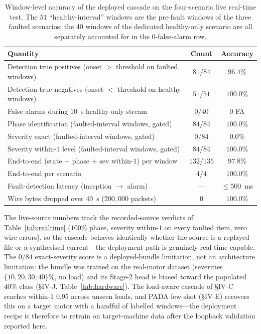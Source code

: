 \documentclass[journal]{IEEEtran}
\begin{document}
\begin{table}[!t]
\caption{Window-level accuracy of the deployed cascade on the four-scenario live
real-time test. The $51$ ``healthy-interval'' windows are the pre-fault windows of
the three faulted scenarios; the $40$ windows of the dedicated healthy-only scenario
are all separately accounted for in the $0$-false-alarm row.}
\label{tab:liveaccuracy}
\centering
\footnotesize
\begin{tabular}{@{}lcc@{}}
\toprule
Quantity & Count & Accuracy \\
\midrule
Detection true positives (onset $>$ threshold on faulted windows) & $81 / 84$ & $96.4\%$ \\
Detection true negatives (onset $<$ threshold on healthy windows) & $51 / 51$ & $100.0\%$ \\
False alarms during $10$~s healthy-only stream & $0 / 40$ & $0$ FA \\
Phase identification (faulted-interval windows, gated) & $84 / 84$ & $\mathbf{100.0\%}$ \\
Severity exact (faulted-interval windows, gated) & $0 / 84$ & $0.0\%$ \\
Severity within-$1$ level (faulted-interval windows, gated) & $84 / 84$ & $\mathbf{100.0\%}$ \\
\midrule
End-to-end (state $+$ phase $+$ sev within-$1$) per window & $132 / 135$ & $\mathbf{97.8\%}$ \\
End-to-end per scenario & $4 / 4$ & $\mathbf{100.0\%}$ \\
Fault-detection latency (inception $\rightarrow$ alarm) & --- & $\leq\!\!500$~ms \\
Wire bytes dropped over $40$~s ($200{,}000$ packets) & $0$ & $100.0\%$ \\
\bottomrule
\end{tabular}
\end{table}

The live-source numbers track the recorded-source verdicts of Table~\ref{tab:realtime}
($100\%$ phase, severity within-$1$ on every faulted item, zero wire errors), so the
cascade behaves identically whether the source is a replayed file or a synthesised
current---the deployment path is genuinely real-time-capable. The $0/84$ exact-severity
score is a deployed-bundle limitation, not an architecture limitation: the bundle was
trained on the real-motor dataset (severities $\{10, 20, 30, 40\}\%$, no load) and its
Stage-$2$ head is biased toward the populated $40\%$ class (\S IV-J,
Table~\ref{tab:hardware}). The load-aware cascade of \S IV-C reaches within-$1$
$0.95$ across unseen loads, and PADA few-shot (\S IV-E) recovers this on a target motor
with a handful of labelled windows---the deployment recipe is therefore to retrain on
target-machine data after the loopback validation reported here.
\end{document}
